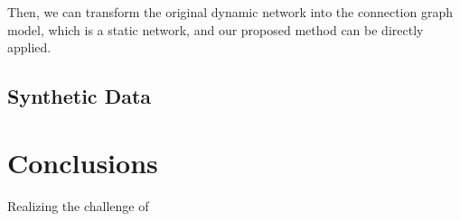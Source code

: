 \documentclass[conference]{IEEEtran}
\begin{document}
Then, we can transform the original dynamic network into the connection graph model, which is a static network, and our proposed method can be directly applied.



\subsection{Synthetic Data}




\section{Conclusions}\label{sec:concl}

Realizing the challenge of 




\end{document}
